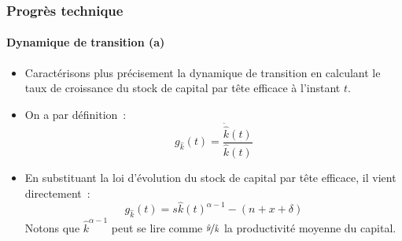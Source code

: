 \documentclass[10pt,notheorems]{beamer}
\theoremstyle{plain}
\theoremstyle{definition} %
\begin{document}
\begin{frame}
  \frametitle{Progrès technique}
  \framesubtitle{Dynamique de transition (a)}

  \bigskip

  \begin{itemize}

  \item Caractérisons plus précisement la dynamique de transition en calculant le taux de croissance du stock de capital par tête efficace à l'instant $t$.\newline

  \item On a par définition~:
    \[
      g_{\hat k}(t) = \frac{\dot{\hat{k}}(t)}{\hat{k}(t)}
    \]

    \bigskip

  \item En substituant la loi d'évolution du stock de capital par tête efficace, il vient directement~:
    \[
      g_{\hat k}(t) = s\hat k(t)^{\alpha-1} - (n+x+\delta)
    \]
    Notons que $\hat k^{\alpha-1}$ peut se lire comme $\nicefrac{\hat y}{\hat k}$ la productivité moyenne du capital.

  \end{itemize}

\end{frame}
\end{document}
